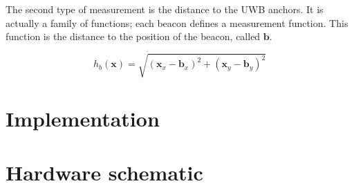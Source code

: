 \documentclass[a4paper]{scrreprt}
\begin{document}
The second type of measurement is the distance to the UWB anchors.
It is actually a family of functions; each beacon defines a measurement function.
This function is the distance to the position of the beacon, called $\mathbf{b}$.

\begin{equation}
    h_b(\mathbf{x}) = \sqrt{\left(\mathbf{x}_x - \mathbf{b}_x\right)^2 + \left(\mathbf{x}_y - \mathbf{b}_y\right)^2}
\end{equation}

\chapter{Implementation}

\appendix
\chapter{Hardware schematic}



\clearpage
\nocite{*} %


\end{document}
